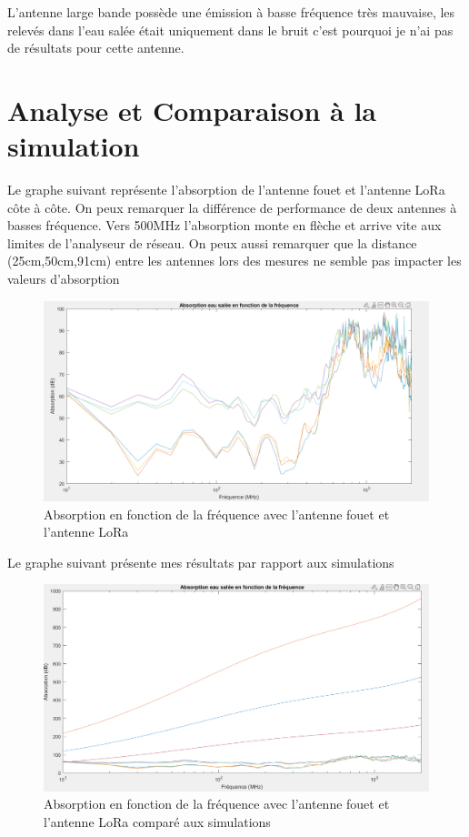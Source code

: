 \documentclass{article}
\begin{document}
L'antenne large bande possède une émission à basse fréquence très mauvaise, les relevés dans l'eau salée était uniquement dans le bruit c'est pourquoi je n'ai pas de résultats pour cette antenne.

\section{Analyse et Comparaison à la simulation}

Le graphe suivant représente l'absorption de l'antenne fouet et l'antenne LoRa côte à côte.
On peux remarquer la différence de performance de deux antennes à basses fréquence. Vers 500MHz l'absorption monte en flèche et arrive vite aux limites de l'analyseur de réseau.
On peux aussi remarquer que la distance (25cm,50cm,91cm) entre les antennes lors des mesures ne semble pas impacter les valeurs d'absorption

\begin{figure}[H]
    \caption{Absorption en fonction de la fréquence avec l'antenne fouet et l'antenne LoRa}
    \includegraphics[scale=0.4]{images/abs_lora_fouet.PNG}
    \centering
\end{figure}


Le graphe suivant présente mes résultats par rapport aux simulations

\begin{figure}[H]
    \caption{Absorption en fonction de la fréquence avec l'antenne fouet et l'antenne LoRa comparé aux simulations}
    \includegraphics[scale=0.4]{images/comp_avec_simu.PNG}
    \centering
\end{figure}
\end{document}
